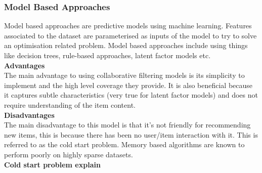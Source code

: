 \subsubsection{Model Based Approaches}
Model based approaches are predictive models using machine learning. Features associated to the dataset are parameterised as inputs of the model to try to solve an optimisation related problem. Model based approaches include using things like decision trees, rule-based approaches, latent factor models etc.
\\\textbf{Advantages}
\\The main advantage to using collaborative filtering models is its simplicity to implement and the high level coverage they provide. It is also beneficial because it captures subtle characteristics (very true for latent factor models) and does not require understanding of the item content.
\\ \textbf{Disadvantages}
\\The main disadvantage to this model is that it’s not friendly for recommending new items, this is because there has been no user/item interaction with it. This is referred to as the cold start problem. Memory based algorithms are known to perform poorly on highly sparse datasets.
\\ \textbf{Cold start problem explain}


